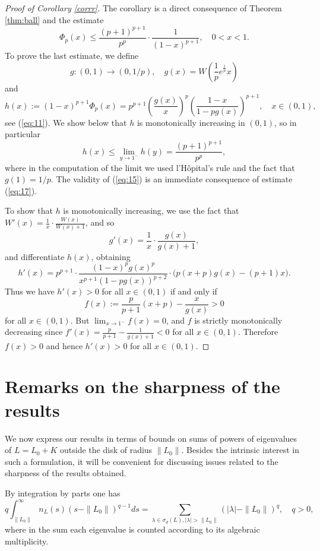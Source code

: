 \documentclass[12pt,a4paper]{article}
\theoremstyle{definition}
\theoremstyle{remark}
\numberwithin{equation}{section}
\begin{document}
\begin{proof}[Proof of Corollary \ref{corrr}] 
  The corollary is a direct consequence of Theorem \ref{thm:ball} and the estimate
  \begin{equation}
    \label{eq:15}
    \Phi_p(x) \leq \frac{(p+1)^{p+1}}{p^p}\cdot \frac{1}{(1-x)^{p+1}}, \quad 0<x<1.
  \end{equation}
To prove the last estimate, we define  
$$ g : (0,1) \to (0,1/p), \quad g(x)=W\left( \frac 1 p e^\frac 1 p x\right)$$ and 
$$h(x):= (1-x)^{p+1}\Phi_p(x)= p^{p+1} \left( \frac{g(x)}{x} \right)^p \left(\frac{1-x} {1-pg(x)} \right)^{p+1}, \quad x \in (0,1),$$
see (\ref{eq:11}). We show below that $h$ is monotonically increasing in $(0,1)$, so in particular
\begin{equation}
\label{eq:17}
h(x) \leq \lim_{y \to 1^-} h(y) = \frac{(p+1)^{p+1}}{p^p},
\end{equation}
where in the computation of the limit we used l'H\^opital's rule and the fact that $g(1)=1/p$. The validity of (\ref{eq:15}) is an immediate consequence of estimate (\ref{eq:17}).

To show that $h$ is monotonically increasing, we use the fact that $ W'(x)= \frac 1 x \cdot \frac {W(x)}{W(x)+1}$,
and so  
$$ g'(x)= \frac 1 x \cdot \frac {g(x)}{g(x)+1},$$
and differentiate $h(x)$, obtaining 
$$h'(x)= p^{p+1}\cdot \frac{(1-x)^p g(x)^p}{x^{p+1}(1-pg(x))^{p+2}}\cdot \Big( p (x+p) g(x)-(p+1)x \Big).$$
Thus we have $h'(x)>0$ for all $x \in (0,1)$ if and only if $$f(x):= \frac{p}{p+1}(x+p)-\frac x {g(x)} > 0$$ for all $x \in (0,1)$. But $\lim_{x \to 1^-}f(x)=0$, and $f$ is strictly monotonically decreasing since $f'(x)= \frac p {p+1} - \frac 1 {g(x)+1} < 0$ for all $x \in (0,1)$. Therefore $f(x) > 0$ and hence $h'(x) > 0$ for all $x \in (0,1)$.
\end{proof}


\section{Remarks on the sharpness of the results}

We now express our results in terms of bounds on sums of powers of eigenvalues of $L=L_0+K$ outside the disk of radius $\|L_0\|$. Besides the 
intrinsic interest in such a formulation, it will be convenient for discussing issues related to the sharpness of the results obtained. 

By integration by parts one has 
\begin{equation}
\label{eq:1}
q \int_{\|L_0\|}^\infty n_L(s) (s-\|L_0\|)^{q-1} ds = \sum_{\lambda \in \sigma_d(L), |\lambda|>\|L_0\|}  (|\lambda|-\|L_0\|)^q, \quad q>0,  
\end{equation}
where in the sum each eigenvalue is counted according to its algebraic multiplicity. 
\end{document}
